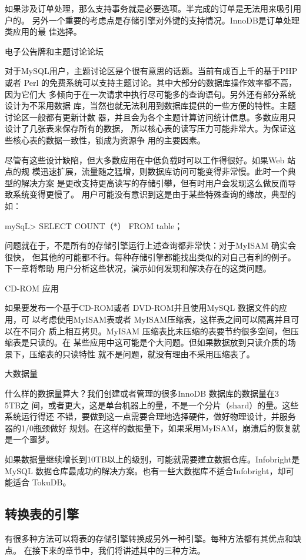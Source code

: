 如果涉及订单处理，那么支持事务就是必要选项。半完成的订单是无法用来吸引用户的。
另外一个重要的考虑点是存储引擎对外键的支持情况。InnoDB是订单处理类应用的最
佳选择。

电子公告牌和主题讨论论坛

对于MySQL用户，主题讨论区是个很有意思的话题。当前有成百上千的基于PHP或者
Perl 的免费系统可以支持主题讨论。其中大部分的数据库操作效率都不高，因为它们大
多倾向于在一次请求中执行尽可能多的查询语句。另外还有部分系统设计为不采用数据
库，当然也就无法利用到数据库提供的一些方便的特性。主题讨论区一般都有更新计数
器，并且会为各个主题计算访问统计信息。多数应用只设计了几张表来保存所有的数据，
所以核心表的读写压力可能非常大。为保证这些核心表的数据一致性，锁成为资源争
用的主要因素。

尽管有这些设计缺陷，但大多数应用在中低负载时可以工作得很好。如果Web 站点的规
模迅速扩展，流量随之猛增，则数据库访问可能变得非常慢。此时一个典型的解决方案
是更改支持更高读写的存储引攀，但有时用户会发现这么做反而导致系统变得更慢了。
用户可能没有意识到这是由于某些特殊查询的缘故，典型的如：

mySqL> SELECT COUNT（*） FROM table；

问题就在于，不是所有的存储引擎运行上述查询都非常快：对于MyISAM 确实会很快，
但其他的可能都不行。每种存储引擎都能找出类似的对自己有利的例子。下一章将帮助
用户分析这些状况，演示如何发现和解决存在的这类问题。

CD-ROM 应用

如果要发布一个基于CD-ROM或者 DVD-ROM并且使用MySQL 数据文件的应用，可
以考虑使用MyISAM表或者 MyISAM压缩表，这样表之间可以隔离并且可以在不同介
质上相互拷贝。MyISAM 压缩表比未压缩的表要节约很多空间，但压缩表是只读的。在
某些应用中这可能是个大问题。但如果数据放到只读介质的场景下，压缩表的只读特性
就不是问题，就没有理由不采用压缩表了。

大数据量

什么样的数据量算大？我们创建或者管理的很多InnoDB 数据库的数据量在3~ 5TB之
间，或者更大，这是单台机器上的量，不是一个分片（shard）的量。这些系统运行得还
不错，要做到这一点需要合理地选择硬件，做好物理设计，并服务器的1/0瓶颈做好
规划。在这样的数据量下，如果采用MyISAM，崩溃后的恢复就是一个噩梦。

如果数据量继续增长到10TB以上的级别，可能就需要建立数据仓库。Infobright是
MySQL 数据仓库最成功的解决方案。也有一些大数据库不适合Infobright，却可能适合
TokuDB。

\subsection{转换表的引擎}
有很多种方法可以将表的存储引擎转换成另外一种引擎。每种方法都有其优点和缺点。
在接下来的章节中，我们将讲述其中的三种方法。


